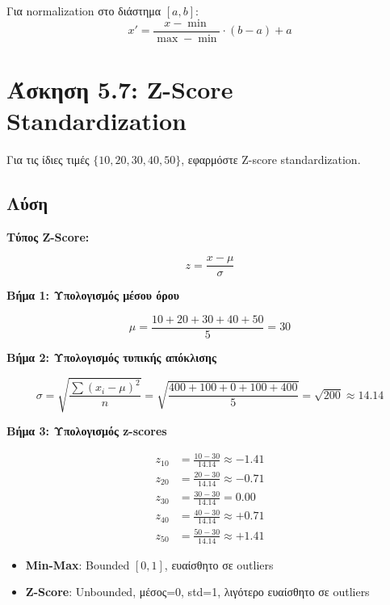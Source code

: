 \begin{infobox}
Για normalization στο διάστημα $[a, b]$:
$$x' = \frac{x - \min}{\max - \min} \cdot (b - a) + a$$
\end{infobox}

\section{Άσκηση 5.7: Z-Score Standardization}

\begin{formulabox}[Εκφώνηση]
Για τις ίδιες τιμές $\{10, 20, 30, 40, 50\}$, εφαρμόστε Z-score standardization.
\end{formulabox}

\subsection*{Λύση}

\textbf{Τύπος Z-Score:}

$$z = \frac{x - \mu}{\sigma}$$

\textbf{Βήμα 1: Υπολογισμός μέσου όρου}

$$\mu = \frac{10 + 20 + 30 + 40 + 50}{5} = 30$$

\textbf{Βήμα 2: Υπολογισμός τυπικής απόκλισης}

$$\sigma = \sqrt{\frac{\sum(x_i - \mu)^2}{n}} = \sqrt{\frac{400 + 100 + 0 + 100 + 400}{5}} = \sqrt{200} \approx 14.14$$

\textbf{Βήμα 3: Υπολογισμός z-scores}

\begin{align*}
z_{10} &= \frac{10 - 30}{14.14} \approx -1.41 \\
z_{20} &= \frac{20 - 30}{14.14} \approx -0.71 \\
z_{30} &= \frac{30 - 30}{14.14} = 0.00 \\
z_{40} &= \frac{40 - 30}{14.14} \approx +0.71 \\
z_{50} &= \frac{50 - 30}{14.14} \approx +1.41
\end{align*}

\begin{infobox}
\begin{itemize}
    \item \textbf{Min-Max}: Bounded $[0,1]$, ευαίσθητο σε outliers
    \item \textbf{Z-Score}: Unbounded, μέσος=0, std=1, λιγότερο ευαίσθητο σε outliers
\end{itemize}
\end{infobox}

